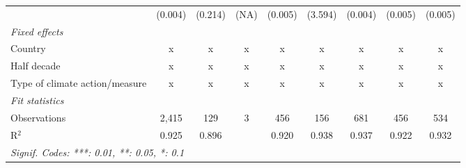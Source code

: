 \begin{table}[htbp]
\begin{tabular}{lcccccccc}
                                                                      & (0.004)       & (0.214)                   & (NA)         & (0.005)        & (3.594)          & (0.004)         & (0.005)         & (0.005)\\   
      \emph{Fixed effects}\\
      Country                                                         & x             & x                         & x            & x              & x                & x               & x               & x\\  
      Half decade                                                     & x             & x                         & x            & x              & x                & x               & x               & x\\  
      Type of climate action/measure                                  & x             & x                         & x            & x              & x                & x               & x               & x\\  
      \midrule \emph{Fit statistics}\\
      Observations                                                    & 2,415         & 129                       & 3            & 456            & 156              & 681             & 456             & 534\\  
      R$^2$                                                           & 0.925         & 0.896                     &              & 0.920          & 0.938            & 0.937           & 0.922           & 0.932\\  
      \midrule
      \multicolumn{9}{l}{\emph{Signif. Codes: ***: 0.01, **: 0.05, *: 0.1}}\\
   \end{tabular}
\end{table}


